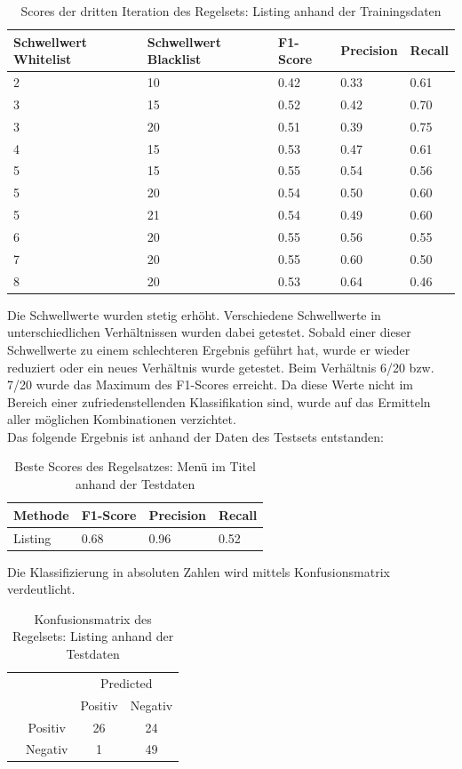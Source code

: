 \begin{table}[H]
	\caption{Scores der dritten Iteration des Regelsets: Listing anhand der Trainingsdaten}
	\centering
	\begin{tabular}{|l|l|l|l|l|}
		\hline
		Schwellwert Whitelist & Schwellwert Blacklist & F1-Score & Precision & Recall\\
		\hline
		2 & 10 & 0.42 & 0.33 & 0.61 \\
		3 & 15 & 0.52 & 0.42 & 0.70 \\
		3 & 20 & 0.51 & 0.39 & 0.75 \\
		4 & 15 & 0.53 & 0.47 & 0.61 \\
		5 & 15 & 0.55 & 0.54 & 0.56 \\
		5 & 20 & 0.54 & 0.50 & 0.60 \\
		5 & 21 & 0.54 & 0.49 & 0.60 \\
		6 & 20 & 0.55 & 0.56 & 0.55 \\
		7 & 20 & 0.55 & 0.60 & 0.50 \\
		8 & 20 & 0.53 & 0.64 & 0.46 \\
		\hline
	\end{tabular}
\end{table}
Die Schwellwerte wurden stetig erhöht.
Verschiedene Schwellwerte in unterschiedlichen Verhältnissen wurden dabei getestet.
Sobald einer dieser Schwellwerte zu einem schlechteren Ergebnis geführt hat, wurde er wieder reduziert oder ein neues Verhältnis wurde getestet.
Beim Verhältnis 6/20 bzw. 7/20 wurde das Maximum des F1-Scores erreicht.
Da diese Werte nicht im Bereich einer zufriedenstellenden Klassifikation sind, wurde auf das Ermitteln aller möglichen Kombinationen verzichtet.
\\
Das folgende Ergebnis ist anhand der Daten des Testsets entstanden:
\begin{table}[H]
	\caption{Beste Scores des Regelsatzes: Menü im Titel anhand der Testdaten}
	\centering
	\begin{tabular}{|l|l|l|l|}
		\hline
		Methode & F1-Score & Precision & Recall\\
		\hline
		Listing & 0.68 & 0.96 & 0.52\\
		\hline
	\end{tabular}
\end{table}
Die Klassifizierung in absoluten Zahlen wird mittels Konfusionsmatrix verdeutlicht.
\begin{table}[H]
	\caption{Konfusionsmatrix des Regelsets: Listing anhand der Testdaten}
	\centering
	\begin{tabular}{@{}cc|cc@{}}
		\multicolumn{1}{c}{} &\multicolumn{1}{c}{} &\multicolumn{2}{c}{Predicted} \\ 
		\multicolumn{1}{c}{} & 
		\multicolumn{1}{c|}{} & 
		\multicolumn{1}{c}{Positiv} & 
		\multicolumn{1}{c}{Negativ} \\ 
		\cline{2-4}
		\multirow[c]{2}{*}{\rotatebox[origin=tr]{90}{Actual}}
		& Positiv  & 26   & 24   \\[1.5ex]
		& Negativ  & 1    & 49 \\ 
		\cline{2-4}
	\end{tabular}
\end{table}
